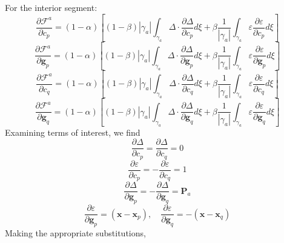 \documentclass[11pt]{article} %
\begin{document}
For the interior segment:
\begin{equation}
	\frac{\partial \mathcal{F}^a}{\partial c_p} = (1-\alpha) \left[ (1-\beta) | \gamma_a | \int_{\gamma_a} \Delta \cdot \frac{\partial \Delta}{\partial c_p} d \xi + \beta \frac{1}{| \gamma_a |} \int_{\gamma_a} \varepsilon \frac{\partial \varepsilon}{\partial c_p} d \xi \right]
\end{equation}
\begin{equation}
	\frac{\partial \mathcal{F}^a}{\partial \mathbf{g}_p} = (1-\alpha) \left[ (1-\beta) | \gamma_a | \int_{\gamma_a} \Delta \cdot \frac{\partial \Delta}{\partial \mathbf{g}_p} d \xi + \beta \frac{1}{| \gamma_a |} \int_{\gamma_a} \varepsilon \frac{\partial \varepsilon}{\partial \mathbf{g}_p} d \xi \right]
\end{equation}
\begin{equation}
	\frac{\partial \mathcal{F}^a}{\partial c_q} = (1-\alpha) \left[ (1-\beta) | \gamma_a | \int_{\gamma_a} \Delta \cdot \frac{\partial \Delta}{\partial c_q} d \xi + \beta \frac{1}{| \gamma_a |} \int_{\gamma_a} \varepsilon \frac{\partial \varepsilon}{\partial c_q} d \xi \right]
\end{equation}
\begin{equation}
	\frac{\partial \mathcal{F}^a}{\partial \mathbf{g}_q} = (1-\alpha) \left[ (1-\beta) | \gamma_a | \int_{\gamma_a} \Delta \cdot \frac{\partial \Delta}{\partial \mathbf{g}_q} d \xi + \beta \frac{1}{| \gamma_a |} \int_{\gamma_a} \varepsilon \frac{\partial \varepsilon}{\partial \mathbf{g}_q} d \xi \right]
\end{equation}
Examining terms of interest, we find
\begin{equation}
	\frac{\partial \Delta}{\partial c_p} = \frac{\partial \Delta}{\partial c_q} = 0
\end{equation}
\begin{equation}
	\frac{\partial \varepsilon}{\partial c_p} = - \frac{\partial \varepsilon}{\partial c_q} = 1
\end{equation}
\begin{equation}
	\frac{\partial \Delta}{\partial \mathbf{g}_p} = - \frac{\partial \Delta}{\partial \mathbf{g}_q} = \mathbf{P}_a
\end{equation}
\begin{equation}
	\frac{\partial \varepsilon}{\partial \mathbf{g}_p} = (\mathbf{x} - \mathbf{x}_p), \quad \frac{\partial \varepsilon}{\partial \mathbf{g}_q} = -(\mathbf{x} - \mathbf{x}_q)
\end{equation}
Making the appropriate substitutions,
\end{document}
